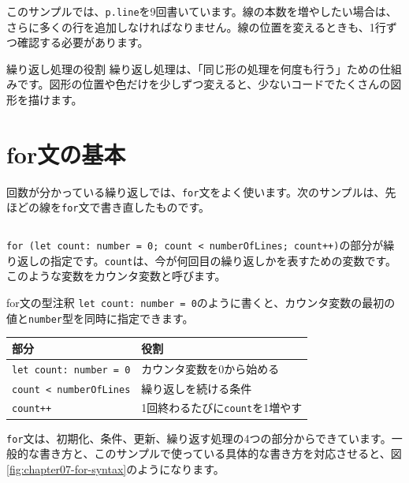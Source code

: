 このサンプルでは、\texttt{p.line}を9回書いています。線の本数を増やしたい場合は、さらに多くの行を追加しなければなりません。線の位置を変えるときも、1行ずつ確認する必要があります。

\begin{pointbox}{繰り返し処理の役割}
繰り返し処理は、「同じ形の処理を何度も行う」ための仕組みです。図形の位置や色だけを少しずつ変えると、少ないコードでたくさんの図形を描けます。
\end{pointbox}

\section{for文の基本}

回数が分かっている繰り返しでは、\texttt{for}文をよく使います。次のサンプルは、先ほどの線を\texttt{for}文で書き直したものです。

\begin{listing}[htbp]
\inputminted{ts}{typescript-p5/listings/chapter07/for-lines.ts}
\caption{for文で線を並べる（\texttt{chapter07/for-lines.ts}）}
\label{lst:chapter07-for-lines}
\end{listing}

\texttt{for (let count: number = 0; count < numberOfLines; count++)}の部分が繰り返しの指定です。\texttt{count}は、今が何回目の繰り返しかを表すための変数です。このような変数をカウンタ変数と呼びます。

\begin{pointbox}{for文の型注釈}
\texttt{let count: number = 0}のように書くと、カウンタ変数の最初の値と\texttt{number}型を同時に指定できます。
\end{pointbox}

\begin{center}
\begin{tabular}{ll}
\toprule
部分 & 役割 \\
\midrule
\texttt{let count: number = 0} & カウンタ変数を0から始める \\
\texttt{count < numberOfLines} & 繰り返しを続ける条件 \\
\texttt{count++} & 1回終わるたびに\texttt{count}を1増やす \\
\bottomrule
\end{tabular}
\end{center}

\texttt{for}文は、初期化、条件、更新、繰り返す処理の4つの部分からできています。一般的な書き方と、このサンプルで使っている具体的な書き方を対応させると、図\ref{fig:chapter07-for-syntax}のようになります。

